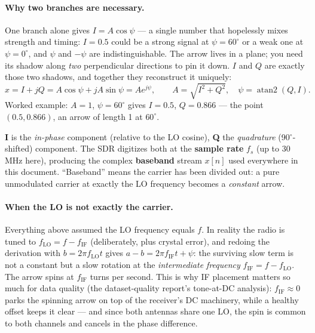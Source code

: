 \paragraph{Why two branches are necessary.}
One branch alone gives $I = A\cos\psi$ --- a single number that hopelessly
mixes strength and timing: $I = 0.5$ could be a strong signal at
$\psi = 60^\circ$ or a weak one at $\psi = 0^\circ$, and $\psi$ and $-\psi$
are indistinguishable. The arrow lives in a plane; you need its shadow along
\emph{two} perpendicular directions to pin it down. $I$ and $Q$ are exactly
those two shadows, and together they reconstruct it uniquely:
\[
x = I + jQ = A\cos\psi + jA\sin\psi = A e^{j\psi},
\qquad
A = \sqrt{I^2 + Q^2}, \quad \psi = \operatorname{atan2}(Q, I).
\]
Worked example: $A = 1$, $\psi = 60^\circ$ gives $I = 0.5$, $Q = 0.866$ ---
the point $(0.5, 0.866)$, an arrow of length 1 at $60^\circ$.

\textbf{I} is the \emph{in-phase} component (relative to the LO cosine),
\textbf{Q} the \emph{quadrature} (90$^\circ$-shifted) component. The SDR
digitizes both at the \textbf{sample rate} $f_s$ (up to 30\,MHz here),
producing the complex \textbf{baseband} stream $x[n]$ used everywhere in this
document. ``Baseband'' means the carrier has been divided out: a pure
unmodulated carrier at exactly the LO frequency becomes a \emph{constant}
arrow.

\paragraph{When the LO is not exactly the carrier.}
Everything above assumed the LO frequency equals $f$. In reality the radio is
tuned to $f_{\mathrm{LO}} = f - f_{\mathrm{IF}}$ (deliberately, plus crystal
error), and redoing the derivation with $b = 2\pi f_{\mathrm{LO}} t$ gives
$a - b = 2\pi f_{\mathrm{IF}} t + \psi$: the surviving slow term is not a
constant but a slow rotation at the \emph{intermediate frequency}
$f_{\mathrm{IF}} = f - f_{\mathrm{LO}}$. The arrow spins at $f_{\mathrm{IF}}$
turns per second. This is why IF placement matters so much for data quality
(the dataset-quality report's tone-at-DC analysis): $f_{\mathrm{IF}} \approx 0$
parks the spinning arrow on top of the receiver's DC machinery, while a
healthy offset keeps it clear --- and since both antennas share one LO, the
spin is common to both channels and cancels in the phase difference.

